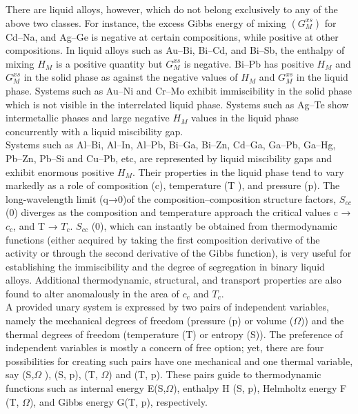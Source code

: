 \documentclass[12pt]{article}
\newcommand*{\1}{\hspace{1pt}}
\begin{document}
            There are liquid alloys, however, which do not belong exclusively to any of the above 
        two classes. For instance, the excess Gibbs energy of mixing $(G ^{xs} _{M} )$ for Cd–Na, and 
        Ag–Ge is negative at certain compositions, while positive at other compositions. In 
        liquid alloys such as Au–Bi, Bi–Cd, and Bi–Sb, the enthalpy of mixing $H_{M}$ is a 
        positive quantity but $G^{xs} _{M}$  is negative. Bi–Pb has positive $H_{M}$ and $G^{xs}_{M} $ in the 
        solid phase as against the negative values of $H_{M}$ and $G^{xs} _{M}$ in the liquid phase\cite{s1}. 
        Systems such as Au–Ni and Cr–Mo exhibit immiscibility in the solid phase which is not 
        visible in the interrelated liquid phase. Systems such as Ag–Te show intermetallic 
        phases and large negative $H_{M}$ values in the liquid phase concurrently with a liquid 
        miscibility gap. \\

        
            Systems such as Al–Bi, Al–In, Al–Pb, Bi–Ga, Bi–Zn, Cd–Ga, Ga–Pb, Ga–Hg, Pb–Zn, Pb–Si 
        and Cu–Pb, etc, are represented by liquid miscibility gaps and exhibit enormous positive 
        $H_{M}$. Their properties in the liquid phase tend to vary markedly as a role of composition (c),
        temperature (T ), and pressure (p). The long-wavelength limit (q→0)of the 
        composition–composition structure factors, $S_{cc}$ (0) diverges as the composition and 
        temperature approach the critical values c → $c_{c}$, and T → $T_{c}$. $S_{cc}$ (0), which can instantly
        be obtained from thermodynamic functions (either acquired by taking the first composition 
        derivative of the activity or through the second derivative of the Gibbs function), is 
        very useful for establishing the immiscibility and the degree of segregation in binary 
        liquid alloys. Additional thermodynamic, structural, and transport properties are also 
        found to alter anomalously in the area of $c_{c}$ and $T_{c}$. \\ 


            A provided unary system is expressed by two pairs of independent variables, namely 
        the mechanical degrees of freedom (pressure (p) or volume ($\Omega$)) and the thermal 
        degrees of freedom (temperature (T) or entropy (S)). The preference of independent 
        variables is mostly a concern of free option; yet, there are four possibilities for 
        creating such pairs have one mechanical and one thermal variable, say (S,$\Omega$ ), 
        (S, p), (T, $\Omega$) and (T, p). These pairs guide to thermodynamic functions such as 
        internal energy E(S,$\Omega$), enthalpy H (S, p), Helmholtz energy F (T, $\Omega$), and 
        Gibbs energy G(T, p), respectively.\\
\end{document}
